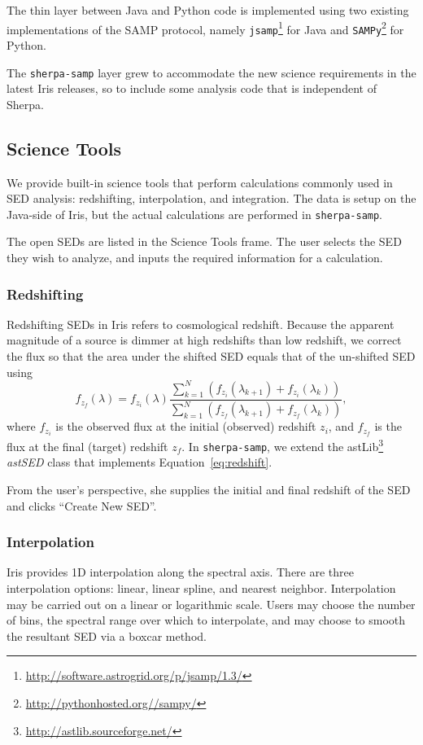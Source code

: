 \documentclass[final,5p,authoryear]{elsarticle}
\begin{document}
The thin layer between Java and Python code is implemented using two existing
implementations of the SAMP protocol, namely
\verb|jsamp|\footnote{\url{http://software.astrogrid.org/p/jsamp/1.3/}} for Java and
\verb|SAMPy|\footnote{\url{http://pythonhosted.org//sampy/}} for Python.

The \verb|sherpa-samp| layer grew to accommodate the new science requirements in
the latest Iris releases, so to include some analysis code that is
independent of Sherpa.

\subsection{Science Tools} We provide built-in science tools that perform
calculations commonly used in SED analysis: redshifting, interpolation, and
integration. The data is setup on the Java-side of Iris, but the actual
calculations are performed in \verb|sherpa-samp|.

The open SEDs are listed in the Science Tools frame. The user selects the SED
they wish to analyze, and inputs the required information for a calculation.

\subsubsection{Redshifting} Redshifting SEDs in Iris refers to cosmological
redshift. Because the apparent magnitude of a source is dimmer at high redshifts
than low redshift, we correct the flux so that the area under the shifted SED
equals that of the un-shifted SED using
\begin{equation} \label{eq:redshift} f_{z_{f}}(\lambda) = f_{z_{i}}(\lambda)
\frac{\sum_{k=1}^N
(f_{z_{i}}(\lambda_{k+1})+f_{z_{i}}(\lambda_{k}))}{\sum_{k=1}^N
(f_{z_{f}}(\lambda_{k+1})+f_{z_{f}}(\lambda_{k}))}, \end{equation}
where $f_{z_i}$ is the observed flux at the initial (observed) redshift $z_i$,
and $f_{z_f}$ is the flux at the final (target) redshift $z_f$. In
\verb|sherpa-samp|, we extend the
astLib\footnote{\url{http://astlib.sourceforge.net/}} \textit{astSED} class that
implements Equation~\ref{eq:redshift}.

From the user's perspective, she supplies the initial and final redshift of the
SED and clicks ``Create New SED''.

\subsubsection{Interpolation} Iris provides 1D interpolation along the spectral
axis. There are three interpolation options: linear, linear spline, and nearest
neighbor. Interpolation may be carried out on a linear or logarithmic scale.
Users may choose the number of bins, the spectral range over which to
interpolate, and may choose to smooth the resultant SED via a boxcar method.
\end{document}
